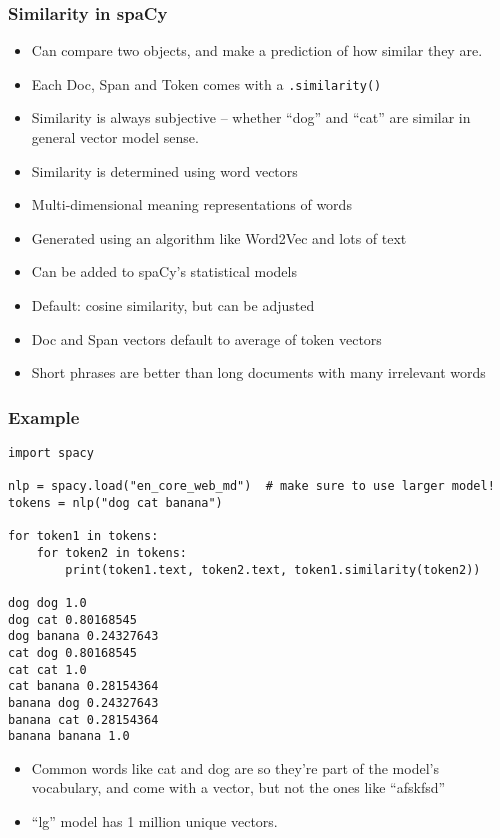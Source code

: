 \begin{frame}[fragile]\frametitle{Similarity in spaCy}

\begin{itemize}
\item Can compare two objects, and make a prediction of how similar they are. 
\item Each Doc, Span and Token comes with a \lstinline|.similarity()|
\item Similarity is always subjective – whether “dog” and “cat” are similar in general vector model sense.
\item Similarity is determined using word vectors
\item Multi-dimensional meaning representations of words
\item Generated using an algorithm like Word2Vec and lots of text
\item Can be added to spaCy's statistical models
\item Default: cosine similarity, but can be adjusted
\item Doc and Span vectors default to average of token vectors
\item Short phrases are better than long documents with many irrelevant words
\end{itemize}
\end{frame}
\begin{frame}[fragile]\frametitle{Example}

\begin{lstlisting}
import spacy

nlp = spacy.load("en_core_web_md")  # make sure to use larger model!
tokens = nlp("dog cat banana")

for token1 in tokens:
    for token2 in tokens:
        print(token1.text, token2.text, token1.similarity(token2))
		
dog dog 1.0
dog cat 0.80168545
dog banana 0.24327643
cat dog 0.80168545
cat cat 1.0
cat banana 0.28154364
banana dog 0.24327643
banana cat 0.28154364
banana banana 1.0
\end{lstlisting}

\begin{itemize}
\item Common words like cat and dog are so they’re part of the model’s vocabulary, and come with a vector, but not the ones like ``afskfsd''
\item ``lg'' model has 1 million unique vectors.
\end{itemize}
\end{frame}

